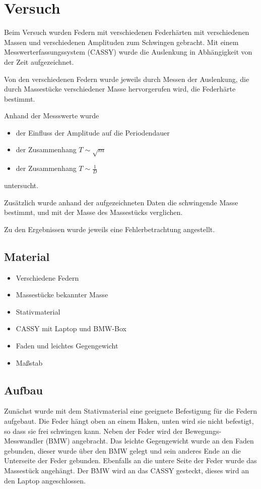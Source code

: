 \chapter{Versuch}

Beim Versuch wurden Federn mit verschiedenen Federhärten mit verschiedenen Massen und verschiedenen Amplituden zum Schwingen gebracht. Mit einem Messwerterfassungssystem (CASSY) wurde die Auslenkung in Abhängigkeit von der Zeit aufgezeichnet.

Von den verschiedenen Federn wurde jeweils durch Messen der Auslenkung, die durch Massestücke verschiedener Masse hervorgerufen wird, die Federhärte bestimmt.

Anhand der Messswerte wurde
\begin{itemize}
    \item der Einfluss der Amplitude auf die Periodendauer
    \item der Zusammenhang $T \sim \sqrt{m}$
    \item der Zusammenhang $T \sim \frac{1}{D}$
\end{itemize}
untersucht.

Zusätzlich wurde anhand der aufgezeichneten Daten die schwingende Masse bestimmt, und mit der Masse des Massestücks verglichen.

Zu den Ergebnissen wurde jeweils eine Fehlerbetrachtung angestellt.

\section{Material}
\begin{itemize}
    \item Verschiedene Federn
    \item Massestücke bekannter Masse
    \item Stativmaterial
    \item CASSY mit Laptop und BMW-Box
    \item Faden und leichtes Gegengewicht
    \item Maßstab
\end{itemize}

\section{Aufbau}
Zunächst wurde mit dem Stativmaterial eine geeignete Befestigung für die Federn aufgebaut. Die Feder hängt oben an einem Haken, unten wird sie nicht befestigt, so dass sie frei schwingen kann. Neben der Feder wird der Bewegungs-Messwandler (BMW) angebracht. Das leichte Gegengewicht wurde an den Faden gebunden, dieser wurde über den BMW gelegt und sein anderes Ende an die Unterseite der Feder gebunden. Ebenfalls an die untere Seite der Feder wurde das Massestück angehängt.
Der BMW wird an das CASSY gesteckt, dieses wird an den Laptop angeschlossen.

